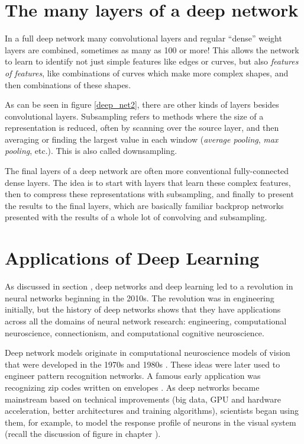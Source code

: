 \section{The many layers of a deep network}

In a full deep network many convolutional layers and regular ``dense'' weight layers are combined, sometimes as many as 100 or more! This allows the network to learn to identify not just simple features like edges or curves, but also \emph{features of features}, like combinations of curves which make more complex shapes, and then combinations of these shapes. 

As can be seen in figure \ref{deep_net2}, there are other kinds of layers besides convolutional layers. Subsampling refers to methods where the size of a representation is reduced, often by scanning over the source layer, and then averaging or finding the largest value in each window (\emph{average pooling}, \emph{max pooling}, etc.).  This is also called downsampling.  

The final layers of a deep network are often more conventional fully-connected dense layers. The idea is to start with layers that learn these complex features, then to compress these representations with subsampling, and finally to present the results to the final layers, which are basically familiar backprop networks presented with the results of a whole lot of convolving and subsampling.

\section{Applications of Deep Learning}

 
As discussed in section , deep networks and deep learning led to a revolution in neural networks beginning in the 2010s. The revolution was in engineering initially, but the history of deep networks shows that they have applications across all the domains of neural network research: engineering, computational neuroscience, connectionism, and computational cognitive neuroscience. 

Deep network models originate in  computational neuroscience models of vision that were developed in the 1970s and 1980s \cite{fukushima1982neocognitron}.  These ideas were later used to engineer pattern recognition networks. A famous early application was recognizing zip codes written on envelopes \cite{lecun1989backpropagation}. As deep networks became mainstream based on technical improvements (big data, GPU and hardware acceleration, better architectures and training algorithms), scientists began using them, for example, to model the response profile of neurons in the visual system (recall the discussion of figure  in chapter ). 

